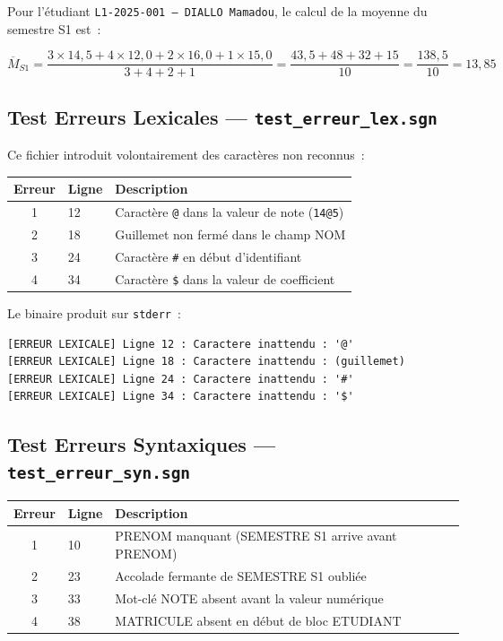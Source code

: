 \documentclass[a4paper,12pt]{article}
\begin{document}
Pour l'étudiant \texttt{L1-2025-001 — DIALLO Mamadou}, le calcul de la moyenne du semestre S1 est~:

$$\overline{M}_{S1} = \frac{3 \times 14{,}5 + 4 \times 12{,}0 + 2 \times 16{,}0 + 1 \times 15{,}0}{3 + 4 + 2 + 1} = \frac{43{,}5 + 48 + 32 + 15}{10} = \frac{138{,}5}{10} = 13{,}85$$

\subsection{Test Erreurs Lexicales — \texttt{test\_erreur\_lex.sgn}}

Ce fichier introduit volontairement des caractères non reconnus~:

\begin{center}
\begin{tabular}{cll}
\toprule
\textbf{Erreur} & \textbf{Ligne} & \textbf{Description} \\
\midrule
1 & 12 & Caractère \texttt{@} dans la valeur de note (\texttt{14@5}) \\
2 & 18 & Guillemet non fermé dans le champ NOM \\
3 & 24 & Caractère \texttt{\#} en début d'identifiant \\
4 & 34 & Caractère \texttt{\$} dans la valeur de coefficient \\
\bottomrule
\end{tabular}
\end{center}

Le binaire produit sur \texttt{stderr}~:
\begin{verbatim}
[ERREUR LEXICALE] Ligne 12 : Caractere inattendu : '@'
[ERREUR LEXICALE] Ligne 18 : Caractere inattendu : (guillemet)
[ERREUR LEXICALE] Ligne 24 : Caractere inattendu : '#'
[ERREUR LEXICALE] Ligne 34 : Caractere inattendu : '$'
\end{verbatim}

\subsection{Test Erreurs Syntaxiques — \texttt{test\_erreur\_syn.sgn}}

\begin{center}
\begin{tabular}{cll}
\toprule
\textbf{Erreur} & \textbf{Ligne} & \textbf{Description} \\
\midrule
1 & 10 & PRENOM manquant (SEMESTRE S1 arrive avant PRENOM) \\
2 & 23 & Accolade fermante de SEMESTRE S1 oubliée \\
3 & 33 & Mot-clé NOTE absent avant la valeur numérique \\
4 & 38 & MATRICULE absent en début de bloc ETUDIANT \\
\bottomrule
\end{tabular}
\end{center}
\end{document}
